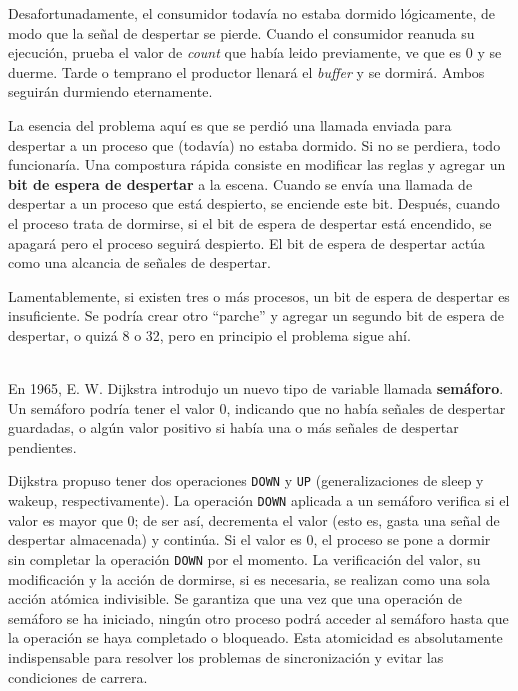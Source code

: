 \documentclass{article}
\begin{document}
Desafortunadamente, el consumidor todav\'ia no estaba dormido 
l\'ogicamente, de modo que la se\~nal de despertar se pierde. Cuando el 
consumidor reanuda su ejecuci\'on, prueba el valor de {\it count} que 
hab\'ia leido previamente, ve que es 0 y se duerme. Tarde o temprano 
el productor llenar\'a el {\it buffer} y se dormir\'a. Ambos seguir\'an 
durmiendo eternamente. 

La esencia del problema aqu\'i es que se perdi\'o una llamada enviada 
para despertar a un proceso que (todav\'ia) no estaba dormido. Si no 
se perdiera, todo funcionar\'ia. Una compostura r\'apida consiste en 
modificar las reglas y agregar un {\bf bit de espera de despertar} a 
la escena. Cuando se env\'ia una llamada de despertar a un proceso que 
est\'a despierto, se enciende este bit. Despu\'es, cuando el proceso 
trata de dormirse, si el bit de espera de despertar est\'a encendido, 
se apagar\'a pero el proceso seguir\'a despierto. El bit de espera 
de despertar act\'ua como una alcancia de se\~nales de despertar.

Lamentablemente, si existen tres o m\'as procesos, un bit de espera de 
despertar es insuficiente. Se podr\'ia crear otro ``parche'' y agregar 
un segundo bit de espera de despertar, o quiz\'a 8 o 32, pero en 
principio el problema sigue ah\'i.

\\
En 1965, E. W. Dijkstra introdujo un nuevo tipo de variable llamada 
{\bf sem\'aforo}. Un sem\'aforo podr\'ia tener el valor 0, indicando 
que no hab\'ia se\~nales de despertar guardadas, o alg\'un valor positivo 
si hab\'ia una o m\'as se\~nales de despertar pendientes. 

Dijkstra propuso tener dos operaciones {\tt DOWN} y {\tt UP} 
(generalizaciones de sleep y wakeup, respectivamente). La operaci\'on 
{\tt DOWN} aplicada a un sem\'aforo verif\/ica si el valor es mayor que 
0; de ser as\'i, decrementa el valor (esto es, gasta una se\~nal de 
despertar almacenada) y contin\'ua. Si el valor es 0, el proceso se 
pone a dormir sin completar la operaci\'on {\tt DOWN} por el momento. 
La verificaci\'on del valor, su modificaci\'on y la acci\'on de dormirse,  
si es necesaria, se realizan como una sola {acci\'on at\'omica} indivisible. 
Se garantiza que una vez que una operaci\'on de sem\'aforo se ha iniciado, 
ning\'un otro proceso podr\'a acceder al sem\'aforo hasta que la operaci\'on 
se haya completado o bloqueado. Esta atomicidad es absolutamente indispensable 
para resolver los problemas de sincronizaci\'on y evitar las condiciones de 
carrera.
\end{document}
